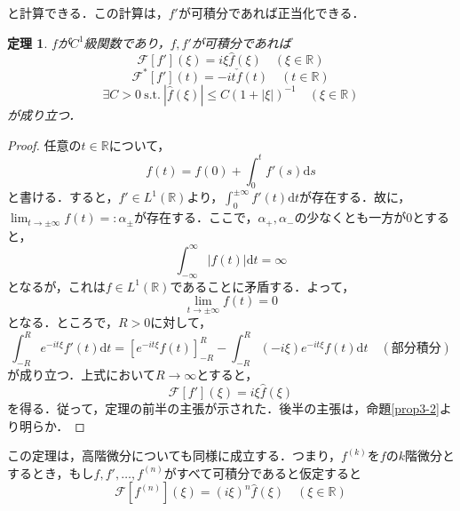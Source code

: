\documentclass[a4j]{jsbook}
\newtheorem{theorem}{定理}
\numberwithin{theorem}{chapter}  %
\begin{document}
と計算できる．この計算は，\(f'\)が可積分であれば正当化できる．
\begin{theorem}
\label{th3-9}
\(f\)が\(C^1\)級関数であり，\(f, f'\)が可積分であれば
\begin{equation*}
    \mathcal{F}[f'](\xi)=i\xi\hat{f}(\xi)\quad(\xi\in\mathbb{R})
\end{equation*}
\begin{equation*}
    \mathcal{F}^*[f'](t)=-it\check{f}(t)\quad(t\in\mathbb{R})
\end{equation*}
\begin{equation*}
    \exists C>0\ \mathrm{s.t.}\ \left|\hat{f}(\xi)\right|\leq C\left(1+|\xi|\right)^{-1}\quad(\xi\in\mathbb{R})
\end{equation*}
が成り立つ．
\end{theorem}
\begin{proof}
任意の\(t\in\mathbb{R}\)について，
\begin{equation*}
    f(t)=f(0)+\int_0^t f'(s)\mathrm{d}s
\end{equation*}
と書ける．すると，\(f'\in L^1(\mathbb{R})\)より，\(\displaystyle\int_0^{\pm\infty}f'(t)\mathrm{d}t\)が存在する．故に，\(\displaystyle \lim_{t\to\pm\infty}f(t)=:\alpha_{\pm}\)が存在する．ここで，\(\alpha_+, \alpha_-\)の少なくとも一方が0とすると，
\begin{equation*}
    \int_{-\infty}^\infty|f(t)|\mathrm{d}t=\infty
\end{equation*}
となるが，これは\(f\in L^1(\mathbb{R})\)であることに矛盾する．よって，
\begin{equation*}
    \lim_{t\to\pm\infty}f(t)=0
\end{equation*}
となる．ところで，\(R>0\)に対して，
\begin{equation*}
    \int_{-R}^R e^{-it\xi}f'(t)\mathrm{d}t=\left[e^{-it\xi}f(t)\right]_{-R}^R-\int_{-R}^R(-i\xi)e^{-it\xi}f(t)\mathrm{d}t\quad(\mbox{部分積分})
\end{equation*}
が成り立つ．上式において\(R\to\infty\)とすると，
\begin{equation*}
    \mathcal{F}[f'](\xi)=i\xi\hat{f}(\xi)
\end{equation*}
を得る．従って，定理の前半の主張が示された．後半の主張は，命題\ref{prop3-2}より明らか．
\end{proof}
この定理は，高階微分についても同様に成立する．つまり，\(f^{(k)}\)を\(f\)の\(k\)階微分とするとき，もし\(f, f', \dots, f^{(n)}\)がすべて可積分であると仮定すると
\begin{equation*}
    \mathcal{F}\left[f^{(n)}\right](\xi)=(i\xi)^n\hat{f}(\xi)\quad(\xi\in\mathbb{R})
\end{equation*}
\end{document}
